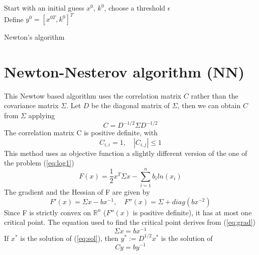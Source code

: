 \begin{algorithm}
Start with an initial guess $x^{0}$, $k^{0}$, choose a threshold $\epsilon$\\

Define $y^{0} = [x^{0T}, k^{0}]^T$\\

\caption{Newton's algorithm}
\label{alg:newton}
\end{algorithm}


\section{Newton-Nesterov algorithm (NN)}
This Newtow based algorithm uses the correlation matrix $C$ rather than the covariance matrix $\Sigma$. Let $D$ be the diagonal matrix of $\Sigma$, then we can obtain $C$ from $\Sigma$ applying
\begin{equation}
C = D^{-1/2}\Sigma D^{-1/2}
\end{equation}
The correlation matrix C is positive definite, with
\begin{equation}\label{eq:corr}
C_{i,i} = 1, \quad |C_{i,j}| \leq 1 
\end{equation}
This method uses as objective function a slightly different version of the one of the problem (\ref{eq:log1})
\begin{equation}
F(x) = \frac{1}{2} x^T \Sigma x - \sum_{i=1}^n b_i ln(x_i)
\end{equation}
The gradient and the Hessian of F are given by
\begin{equation}\label{eq:grad}
F'(x) = \Sigma x - bx^{-1}, \quad F''(x) = \Sigma + diag(bx^{-2})
\end{equation}
Since F is strictly convex on $\mathbb{R}^n$ ($F''(x)$ is positive definite), it has at most one critical point. The equation used to find the critical point derives from (\ref{eq:grad})
\begin{equation}\label{eq:sol}
\Sigma x = bx^{-1}
\end{equation}
If $x^*$ is the solution of (\ref{eq:sol}), then $y^* := D^{1/2}x^*$ is the solution of
\begin{equation}
Cy = by^{-1}
\end{equation}
